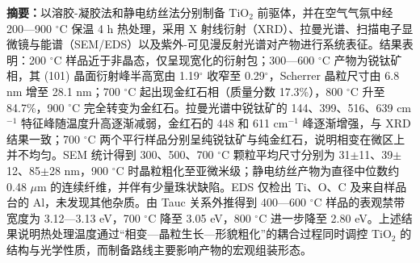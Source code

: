 {\songti\fontsize{9.5pt}{13.5pt}\selectfont
\noindent\textbf{摘要：}以溶胶-凝胶法和静电纺丝法分别制备 TiO$_2$ 前驱体，并在空气气氛中经 200—900 $^\circ$C 保温 4 h 热处理，采用 X 射线衍射（XRD）、拉曼光谱、扫描电子显微镜与能谱（SEM/EDS）以及紫外-可见漫反射光谱对产物进行系统表征。结果表明：200 $^\circ$C 样品近于非晶态，仅呈现宽化的衍射包；300—600 $^\circ$C 产物为锐钛矿相，其 (101) 晶面衍射峰半高宽由 1.19$^\circ$ 收窄至 0.29$^\circ$，Scherrer 晶粒尺寸由 6.8 nm 增至 28.1 nm；700 $^\circ$C 起出现金红石相（质量分数 17.3\%），800 $^\circ$C 升至 84.7\%，900 $^\circ$C 完全转变为金红石。拉曼光谱中锐钛矿的 144、399、516、639 cm$^{-1}$ 特征峰随温度升高逐渐减弱，金红石的 448 和 611 cm$^{-1}$ 峰逐渐增强，与 XRD 结果一致；700 $^\circ$C 两个平行样品分别呈纯锐钛矿与纯金红石，说明相变在微区上并不均匀。SEM 统计得到 300、500、700 $^\circ$C 颗粒平均尺寸分别为 31$\pm$11、39$\pm$12、85$\pm$28 nm，900 $^\circ$C 时晶粒粗化至亚微米级；静电纺丝产物为直径中位数约 0.48 $\mu$m 的连续纤维，并伴有少量珠状缺陷。EDS 仅检出 Ti、O、C 及来自样品台的 Al，未发现其他杂质。由 Tauc 关系外推得到 400—600 $^\circ$C 样品的表观禁带宽度为 3.12—3.13 eV，700 $^\circ$C 降至 3.05 eV，800 $^\circ$C 进一步降至 2.80 eV。上述结果说明热处理温度通过“相变—晶粒生长—形貌粗化”的耦合过程同时调控 TiO$_2$ 的结构与光学性质，而制备路线主要影响产物的宏观组装形态。\par}
